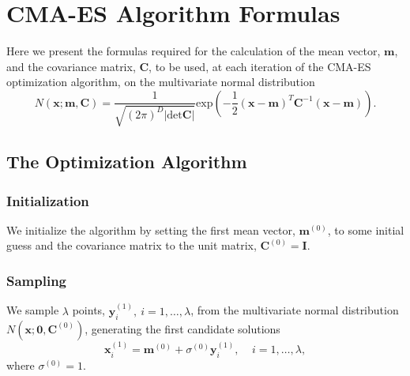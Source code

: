 
\chapter{CMA-ES Algorithm Formulas}
\label{chapter:CMAESAlg}

Here we present the formulas required for the calculation of the mean vector, $\mathbf{m}$, and the covariance matrix, $\mathbf{C}$, to be used, at each iteration of the CMA-ES optimization algorithm, on the multivariate normal distribution
\begin{equation}
N(\mathbf{x;m,C})=\frac{1}{\sqrt{(2\pi)^D|\mathrm{det}\mathbf{C}|}}\mathrm{exp}\left(-\frac{1}{2}(\mathbf{x}-\mathbf{m})^T\mathbf{C}^{-1}(\mathbf{x}-\mathbf{m})\right).
\end{equation}

\section{The Optimization Algorithm}
\subsection{Initialization}
We initialize the algorithm by setting the first mean vector, $\mathbf{m}^{(0)}$, to some initial guess and the covariance matrix to the unit matrix, $\mathbf{C}^{(0)}=\mathbf{I}$.

\subsection{Sampling}
We sample $\lambda$ points, $\mathbf{y}_i^{(1)},\ i=1,\ldots,\lambda$, from the multivariate normal distribution $N(\mathbf{x};\mathbf{0},\mathbf{C}^{(0)})$, generating the first candidate solutions
\begin{equation}
\mathbf{x}^{(1)}_i=\mathbf{m}^{(0)}+\sigma^{(0)}\mathbf{y}^{(1)}_i, \ \ \ \ \ i=1,\ldots,\lambda,
\end{equation} 
\noindent where $\sigma^{(0)}=1$.

